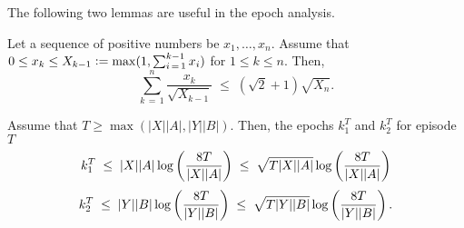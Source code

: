 \documentclass[12pt, final]{l4dc2023}
\begin{document}
The following two lemmas are useful in the epoch analysis. 
\begin{lemma}\citep{jaksch2010near}\label{lem.series} %
	Let a sequence of positive numbers be $x_1,\ldots,x_n$. Assume that $0\leq x_k\leq X_{k-1}\mathrel{\mathop:}= \max(1, \sum_{i\,=\,1}^{k-1}x_i)$ for $1\leq k\leq n$. Then,
	\[
	\sum_{k\,=\,1}^{n}\frac{x_k}{\sqrt{X_{k-1}}}\;\leq\;(\sqrt{2}+1)\sqrt{X_n}.
	\]
\end{lemma}

\begin{lemma}\citep{jaksch2010near}\label{lem.epoch} %
	Assume that $T\geq \max(|X||A|, |Y||B|)$. Then, the epochs $k_1^T$ and $k_2^T$ for episode $T$ 
	\[
	k_1^T\;\leq\; |X||A|\log \left(\frac{8T}{|X||A|}\right)\;\leq\;\sqrt{T  |X||A|}\log \left(\frac{8T}{|X||A|}\right)
	\]
	\[
	k_2^T\;\leq\; |Y||B|\log \left(\frac{8T}{|Y||B|}\right)\;\leq\;\sqrt{T  |Y||B|}\log \left(\frac{8T}{|Y||B|}\right).
	\]
\end{lemma}
\end{document}
